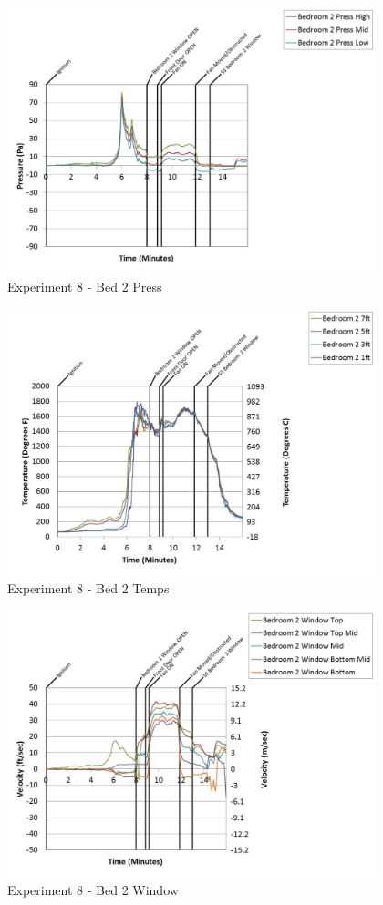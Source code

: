 \documentclass{article}
\begin{document}
\begin{appendices}
	\begin{figure}[h!]
		\centering
		\includegraphics[height=3.05in]{0_Images/Results_Charts/Exp_8_Charts/Bed2Press.pdf}
		\caption{Experiment 8 - Bed 2 Press}
	\end{figure}
 
	\clearpage

	\begin{figure}[h!]
		\centering
		\includegraphics[height=3.05in]{0_Images/Results_Charts/Exp_8_Charts/Bed2Temps.pdf}
		\caption{Experiment 8 - Bed 2 Temps}
	\end{figure}
 

	\begin{figure}[h!]
		\centering
		\includegraphics[height=3.05in]{0_Images/Results_Charts/Exp_8_Charts/Bed2Window.pdf}
		\caption{Experiment 8 - Bed 2 Window}
	\end{figure}
 

\end{appendices}
\end{document}
